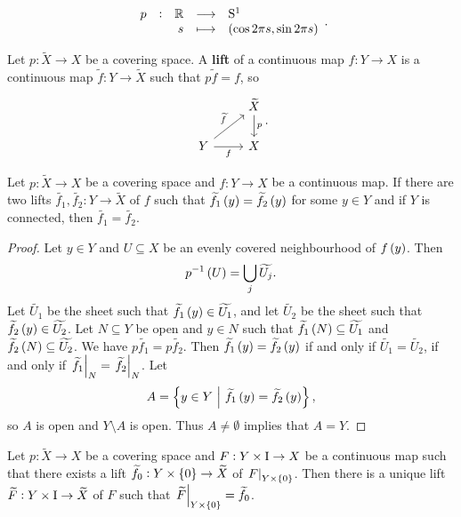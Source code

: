 \begin{example*}
$$ \function[p]{\RR}{\S^1}{s}{\br{\cos 2\pi s, \sin 2\pi s}}. $$
\end{example*}

\pagebreak

\begin{definition*}
Let $ p : \widetilde{X} \to X $ be a covering space. A \textbf{lift} of a continuous map $ f : Y \to X $ is a continuous map $ \widetilde{f} : Y \to \widetilde{X} $ such that $ p\widetilde{f} = f $, so
$$
\begin{tikzcd}
& \widetilde{X} \arrow{d}{p} \\
Y \arrow{ur}{\widetilde{f}} \arrow[swap]{r}{f} & X
\end{tikzcd}.
$$
\end{definition*}

\begin{proposition}
\label{prop:1.34}
Let $ p : \widetilde{X} \to X $ be a covering space and $ f : Y \to X $ be a continuous map. If there are two lifts $ \widetilde{f_1}, \widetilde{f_2} : Y \to \widetilde{X} $ of $ f $ such that $ \widetilde{f_1}\br{y} = \widetilde{f_2}\br{y} $ for some $ y \in Y $ and if $ Y $ is connected, then $ \widetilde{f_1} = \widetilde{f_2} $.
\end{proposition}

\begin{proof}
Let $ y \in Y $ and $ U \subseteq X $ be an evenly covered neighbourhood of $ f\br{y} $. Then
$$ p^{-1}\br{U} = \bigcup_j \widetilde{U_j}. $$
Let $ \widetilde{U_1} $ be the sheet such that $ \widetilde{f_1}\br{y} \in \widetilde{U_1} $, and let $ \widetilde{U_2} $ be the sheet such that $ \widetilde{f_2}\br{y} \in \widetilde{U_2} $. Let $ N \subseteq Y $ be open and $ y \in N $ such that $ \widetilde{f_1}\br{N} \subseteq \widetilde{U_1} $ and $ \widetilde{f_2}\br{N} \subseteq \widetilde{U_2} $. We have $ p\widetilde{f_1} = p\widetilde{f_2} $. Then $ \widetilde{f_1}\br{y} = \widetilde{f_2}\br{y} $ if and only if $ \widetilde{U_1} = \widetilde{U_2} $, if and only if $ \left. \widetilde{f_1} \right|_N = \left. \widetilde{f_2} \right|_N $. Let
$$ A = \cbr{y \in Y \st \widetilde{f_1}\br{y} = \widetilde{f_2}\br{y}}, $$
so $ A $ is open and $ Y \setminus A $ is open. Thus $ A \ne \emptyset $ implies that $ A = Y $.
\end{proof}

\begin{proposition}
\label{prop:1.30}
Let $ p : \widetilde{X} \to X $ be a covering space and $ F : Y \times \mathrm{I} \to X $ be a continuous map such that there exists a lift $ \widetilde{f_0} : Y \times \cbr{0} \to \widetilde{X} $ of $ \eval{F}_{Y \times \cbr{0}} $. Then there is a unique lift $ \widetilde{F} : Y \times \mathrm{I} \to \widetilde{X} $ of $ F $ such that $ \eval{\widetilde{F}}_{Y \times \cbr{0}} = \widetilde{f_0} $.
\end{proposition}

